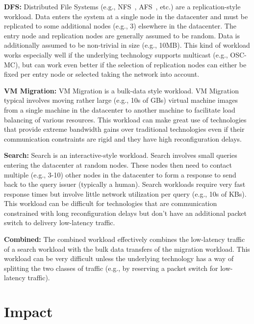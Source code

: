 {\bf DFS:} Distributed File Systems (e.g., NFS~\cite{NFS}, AFS~\cite{AFS}, etc.)
are a replication-style workload. Data enters the system at a single node in the
datacenter and must be replicated to some additional nodes (e.g., 3) elsewhere
in the datacenter. The entry node and replication nodes are generally assumed to
be random. Data is additionally assumed to be non-trivial in size (e.g.,
10MB). This kind of workload works especially well if the underlying technology
supports multicast (e.g., OSC-MC), but can work even better if the selection of
replication nodes can either be fixed per entry node or selected taking the
network into account.

{\bf VM Migration:} VM Migration is a bulk-data style workload. VM Migration
typical involves moving rather large (e.g., 10s of GBs) virtual machine images
from a single machine in the datacenter to another machine to facilitate load
balancing of various resources. This workload can make great use of technologies
that provide extreme bandwidth gains over traditional technologies even if their
communication constraints are rigid and they have high reconfiguration delays.

{\bf Search:} Search is an interactive-style workload. Search involves small
queries entering the datacenter at random nodes. These nodes then need to
contact multiple (e.g., 3-10) other nodes in the datacenter to form a response
to send back to the query issuer (typically a human). Search workloads require
very fast response times but involve little network utilization per query (e.g.,
10s of KBs). This workload can be difficult for technologies that are
communication constrained with long reconfiguration delays but don't have an
additional packet switch to delivery low-latency traffic.

{\bf Combined:} The combined workload effectively combines the low-latency
traffic of a search workload with the bulk data transfers of the migration
workload. This workload can be very difficult unless the underlying technology
has a way of splitting the two classes of traffic (e.g., by reserving a packet
switch for low-latency traffic).

\section{Impact}
